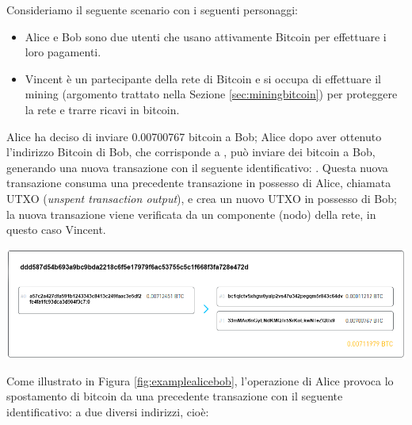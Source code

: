 \begin{example}
\label{example:aliceBobFirst}
Consideriamo il seguente scenario con i seguenti personaggi:

\begin{itemize}
  \item Alice e Bob sono due utenti che usano attivamente Bitcoin per effettuare i loro pagamenti.
  \item Vincent è un partecipante della rete di Bitcoin e si occupa di effettuare il mining (argomento trattato nella Sezione \ref{sec:miningbitcoin}) per proteggere la rete e trarre ricavi in bitcoin.
\end{itemize}

Alice ha deciso di inviare 0.00700767 bitcoin a Bob; Alice dopo aver ottenuto l’indirizzo Bitcoin di Bob, che corrisponde a , può inviare dei bitcoin a Bob, generando una nuova transazione con il seguente identificativo: .\newline
Questa nuova transazione consuma una precedente transazione in possesso di Alice, chiamata UTXO (\emph{unspent transaction output}), e crea un nuovo UTXO in possesso di Bob; la nuova transazione viene verificata da un componente (nodo) della rete, in questo caso Vincent.

{\centering
\vspace{15pt}
\includegraphics[scale=0.35]{images/example_alice_bob_vincent.png}
\vspace{10pt}
\par}

Come illustrato in Figura \ref{fig:examplealicebob}, l'operazione di Alice provoca lo spostamento di bitcoin da una precedente transazione con il seguente identificativo:  a due diversi indirizzi, cioè:

\begin{itemize}


\end{itemize}
\end{example}
